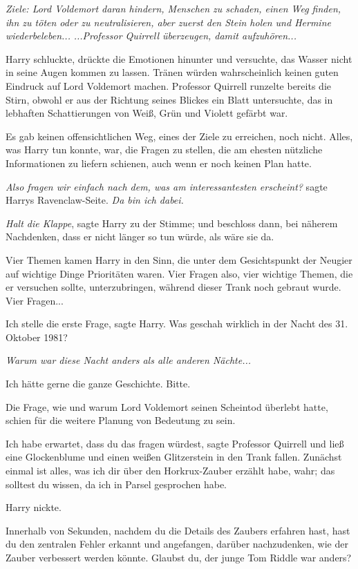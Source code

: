 \emph{Ziele: Lord Voldemort daran hindern, Menschen zu schaden, einen Weg
finden, ihn zu töten oder zu neutralisieren, aber zuerst den Stein holen und
Hermine wiederbeleben... }
\emph{...Professor Quirrell überzeugen, damit aufzuhören... }

Harry schluckte, drückte die Emotionen hinunter und versuchte, das Wasser nicht
in seine Augen kommen zu lassen. Tränen würden wahrscheinlich keinen guten
Eindruck auf Lord Voldemort machen. Professor Quirrell runzelte bereits die
Stirn, obwohl er aus der Richtung seines Blickes ein Blatt untersuchte, das in
lebhaften Schattierungen von Weiß, Grün und Violett gefärbt war.

Es gab keinen offensichtlichen Weg, eines der Ziele zu erreichen, noch nicht.
Alles, was Harry tun konnte, war, die Fragen zu stellen, die am ehesten
nützliche Informationen zu liefern schienen, auch wenn er noch keinen Plan
hatte.

\emph{Also fragen wir einfach nach dem, was am interessantesten erscheint?
}sagte Harrys Ravenclaw-Seite. \emph{Da bin ich dabei.}

\emph{Halt die Klappe}, sagte Harry zu der Stimme; und beschloss dann, bei
näherem Nachdenken, dass er nicht länger so tun würde, als wäre sie da.

Vier Themen kamen Harry in den Sinn, die unter dem Gesichtspunkt der Neugier auf
wichtige Dinge Prioritäten waren. Vier Fragen also, vier wichtige Themen, die er
versuchen sollte, unterzubringen, während dieser Trank noch gebraut wurde. Vier
Fragen...

\glqq Ich stelle die erste Frage\grqq{}, sagte Harry. \glqq Was geschah wirklich
in der Nacht des 31. Oktober 1981?\grqq{}

\emph{Warum war diese Nacht anders als alle anderen Nächte... }

\glqq Ich hätte gerne die ganze Geschichte. Bitte.\grqq{}

Die Frage, wie und warum Lord Voldemort seinen Scheintod überlebt hatte, schien
für die weitere Planung von Bedeutung zu sein.

\glqq Ich habe erwartet, dass du das fragen würdest\grqq{}, sagte Professor
Quirrell und ließ eine Glockenblume und einen weißen Glitzerstein in den Trank
fallen. \glqq Zunächst einmal ist alles, was ich dir über den Horkrux-Zauber
erzählt habe, wahr; das solltest du wissen, da ich in Parsel gesprochen
habe.\grqq{}

Harry nickte.

\glqq Innerhalb von Sekunden, nachdem du die Details des Zaubers erfahren hast,
hast du den zentralen Fehler erkannt und angefangen, darüber nachzudenken, wie
der Zauber verbessert werden könnte. Glaubst du, der junge Tom Riddle war
anders?\grqq{}

